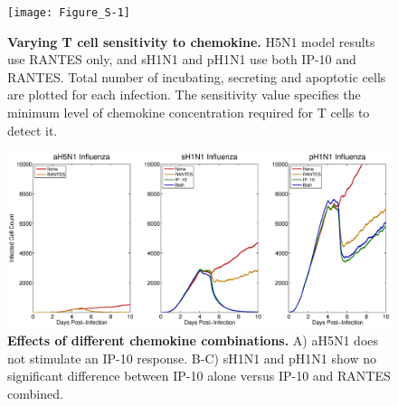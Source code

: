 \documentclass[preprint,10pt,authoryear]{elsarticle}
\begin{document}


\setcounter{figure}{0}
\renewcommand{\thefigure}{S\arabic{figure}}


\begin{figure}[!ht]
\begin{center}
 \texttt{[image: Figure\_S-1]}
 \end{center}
\caption{{\bf Varying T cell sensitivity to chemokine.}  H5N1 model results use RANTES  only, and sH1N1 and pH1N1 use both IP-10 and RANTES. Total number of incubating, secreting and apoptotic cells are plotted for each infection.  The sensitivity value specifies the minimum level of chemokine concentration required for T cells to detect it. } 
 \label{fig:sensitivity}
\end{figure}


\begin{figure}[ht!]
\begin{center}
	\includegraphics[width=\textwidth]{Figure_S2}
	\caption{\textbf{Effects of different chemokine combinations.}  A) aH5N1 does not stimulate an IP-10 response.  B-C) sH1N1 and pH1N1 show no significant difference between IP-10 alone versus IP-10 and RANTES combined.}
	\label{fig:chemokine}
\end{center}
\end{figure}
\end{document}
